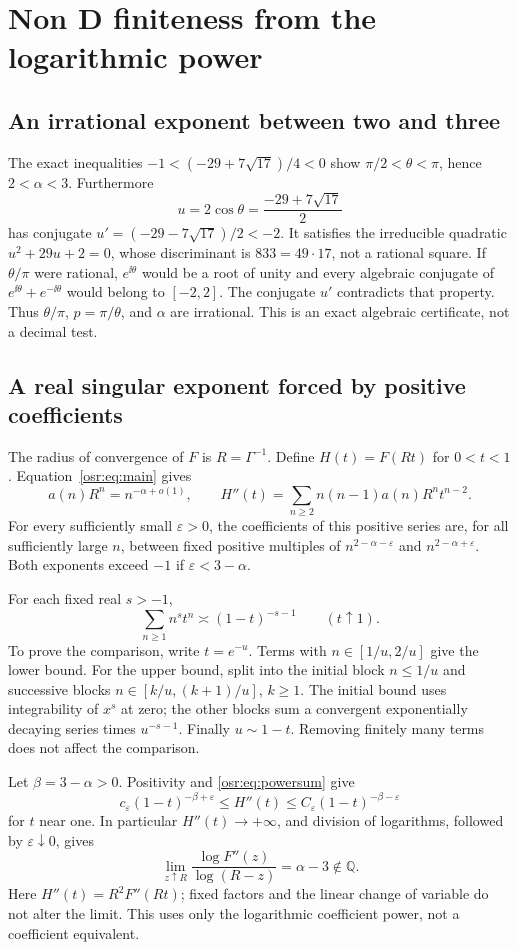 \documentclass[11pt,letterpaper]{article}
\newcommand{\Q}{\mathbb Q}\newcommand{\R}{\mathbb R}\newcommand{\Z}{\mathbb Z}
\newcommand{\G}{\Gamma}\newcommand{\s}{\sqrt{17}}
\numberwithin{equation}{section}
\begin{document}
\section{Non D finiteness from the logarithmic power}\label{osr:sec:nonD}
\subsection{An irrational exponent between two and three}
The exact inequalities $-1<(-29+7\sqrt{17})/4<0$ show $\pi/2<\theta<\pi$, hence $2<\alpha<3$. Furthermore
\[
 u=2\cos\theta=\frac{-29+7\sqrt{17}}2
\]
has conjugate $u'=(-29-7\sqrt{17})/2<-2$. It satisfies the irreducible quadratic $u^2+29u+2=0$, whose discriminant is $833=49\cdot17$, not a rational square. If $\theta/\pi$ were rational, $e^{\ii\theta}$ would be a root of unity and every algebraic conjugate of $e^{\ii\theta}+e^{-\ii\theta}$ would belong to $[-2,2]$. The conjugate $u'$ contradicts that property. Thus $\theta/\pi$, $p=\pi/\theta$, and $\alpha$ are irrational. This is an exact algebraic certificate, not a decimal test.

\subsection{A real singular exponent forced by positive coefficients}
The radius of convergence of $F$ is $R=\G^{-1}$. Define $H(t)=F(Rt)$ for $0<t<1$. Equation~\eqref{osr:eq:main} gives
\[
 a(n)R^n=n^{-\alpha+o(1)},\qquad
 H''(t)=\sum_{n\ge2}n(n-1)a(n)R^nt^{n-2}.
\]
For every sufficiently small $\varepsilon>0$, the coefficients of this positive series are, for all sufficiently large $n$, between fixed positive multiples of $n^{2-\alpha-\varepsilon}$ and $n^{2-\alpha+\varepsilon}$. Both exponents exceed $-1$ if $\varepsilon<3-\alpha$.

For each fixed real $s>-1$,
\begin{equation}\label{osr:eq:powersum}
 \sum_{n\ge1}n^st^n\asymp(1-t)^{-s-1}\qquad(t\uparrow1).
\end{equation}
To prove the comparison, write $t=e^{-u}$. Terms with $n\in[1/u,2/u]$ give the lower bound. For the upper bound, split into the initial block $n\le1/u$ and successive blocks $n\in[k/u,(k+1)/u]$, $k\ge1$. The initial bound uses integrability of $x^s$ at zero; the other blocks sum a convergent exponentially decaying series times $u^{-s-1}$. Finally $u\sim1-t$. Removing finitely many terms does not affect the comparison.

Let $\beta=3-\alpha>0$. Positivity and \eqref{osr:eq:powersum} give
\[
 c_\varepsilon(1-t)^{-\beta+\varepsilon}
 \le H''(t)\le C_\varepsilon(1-t)^{-\beta-\varepsilon}
\]
for $t$ near one. In particular $H''(t)\to+\infty$, and division of logarithms, followed by $\varepsilon\downarrow0$, gives
\begin{equation}\label{osr:eq:singlimit}
 \lim_{z\uparrow R}\frac{\log F''(z)}{\log(R-z)}=\alpha-3\notin\Q.
\end{equation}
Here $H''(t)=R^2F''(Rt)$; fixed factors and the linear change of variable do not alter the limit. This uses only the logarithmic coefficient power, not a coefficient equivalent.
\end{document}
